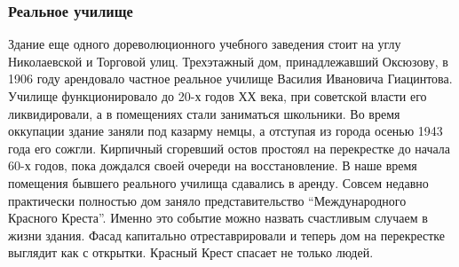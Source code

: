  
 
 
 
 

\subsubsection{Реальное училище}

Здание еще одного дореволюционного учебного заведения стоит на углу
Николаевской и Торговой улиц. Трехэтажный дом, принадлежавший Оксюзову, в 1906
году арендовало частное реальное училище Василия Ивановича Гиацинтова. Училище
функционировало до 20-х годов ХХ века, при советской власти его ликвидировали,
а в помещениях стали заниматься школьники. Во время оккупации здание заняли под
казарму немцы, а отступая из города осенью 1943 года его сожгли. Кирпичный
сгоревший остов простоял на перекрестке до начала 60-х годов, пока дождался
своей очереди на восстановление. В наше время помещения бывшего реального
училища сдавались в аренду. Совсем недавно практически полностью дом заняло
представительство \enquote{Международного Красного Креста}. Именно это событие можно
назвать счастливым случаем в жизни здания. Фасад капитально отреставрировали и
теперь дом на перекрестке выглядит как с открытки. Красный Крест спасает не
только людей.

